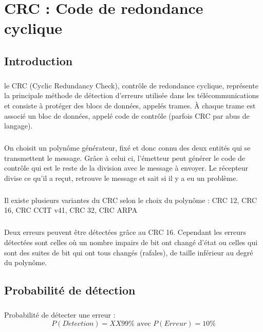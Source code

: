 
\chapter{CRC : Code de redondance cyclique}

    \section{Introduction}

        \paragraph{}
le CRC (Cyclic Redundancy Check), contrôle de redondance cyclique,
représente la principale méthode de détection d'erreurs utilisée dans les télécommunications et
consiste à protéger des blocs de données, appelés trames.
À chaque trame est associé un bloc de données, appelé code de contrôle (parfois CRC par abus de langage).
        \paragraph{}
On choisit un polynôme générateur, fixé et donc connu des deux entités qui se transmettent le message.
Grâce à celui ci, l'émetteur peut générer le code de contrôle qui est le reste de la division avec le message à envoyer.
Le récepteur divise ce qu'il a reçut, retrouve le message et sait si il y a eu un problème.
        \paragraph{}
Il existe plusieurs variantes du CRC selon le choix du polynôme : CRC 12, CRC 16, CRC CCIT v41, CRC 32, CRC ARPA
        \paragraph{}
Deux erreurs peuvent être détectées grâce au CRC 16.
Cependant les erreurs détectées sont celles où un nombre impairs de bit ont changé d'état ou
celles qui sont des suites de bit qui ont tous changés (rafales), de taille inférieur au
degré du polynôme.


    \section{Probabilité de détection}

        \paragraph{}
Probabilité de détecter une erreur :
\[  P(D\acute{e}tection) =  XX99\% \text{ avec } P( Erreur ) = 10\% \]


